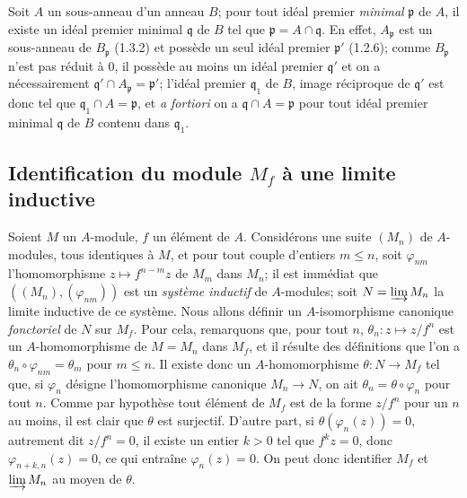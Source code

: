 \begin{env}[1.5.8]
\label{0.1.5.8-fr}
Soit $A$ un sous-anneau d'un anneau $B$; pour tout idéal premier
\emph{minimal} $\mathfrak p$ de $A$, il existe un idéal premier minimal
$\mathfrak q$ de $B$ tel que $\mathfrak p=A\cap\mathfrak q$. En effet,
$A_{\mathfrak p}$ est un sous-anneau de $B_{\mathfrak p}$ (1.3.2) et possède
un seul idéal premier $\mathfrak p'$ (1.2.6); comme $B_{\mathfrak p}$ n'est pas
réduit à $0$, il possède au moins un idéal premier $\mathfrak q'$ et on a
nécessairement $\mathfrak q'\cap A_{\mathfrak p}=\mathfrak p'$; l'idéal premier
$\mathfrak q_1$ de $B$, image réciproque de $\mathfrak q'$ est donc tel que
$\mathfrak q_1\cap A=\mathfrak p$, et \emph{a fortiori} on a
$\mathfrak q\cap A=\mathfrak p$ pour tout idéal premier minimal $\mathfrak q$
de $B$ contenu dans $\mathfrak q_1$.
\end{env}

\subsection{Identification du module $M_f$ à une limite inductive}
\label{subsection:0.1.6-fr}

\begin{env}[1.6.1]
\label{0.1.6.1-fr}
Soient $M$ un $A$-module, $f$ un élément de $A$. Considérons une suite
$(M_n)$ de $A$-modules, tous identiques à $M$, et pour tout couple d'entiers
$m\leq n$, soit $\varphi_{nm}$ l'homomorphisme $z\mapsto f^{n-m}z$ de $M_m$
dans $M_n$; il est immédiat que $((M_n),(\varphi_{nm}))$ est un \emph{système
inductif} de $A$-modules; soit $N=\varinjlim M_n$ la limite inductive de ce
système. Nous allons définir un $A$-isomorphisme canonique \emph{fonctoriel} de
$N$ sur $M_f$. Pour cela, remarquons que, pour tout $n$,
$\theta_n:z\mapsto z/f^n$ est un $A$-homomorphisme de $M=M_n$ dans $M_f$, et
il résulte des définitions que l'on a $\theta_n\circ\varphi_{nm}=\theta_m$ pour
$m\leq n$. Il existe donc un $A$-homomorphisme $\theta:N\to M_f$ tel que, si
$\varphi_n$ désigne l'homomorphisme canonique $M_n\to N$, on ait
$\theta_n=\theta\circ\varphi_n$ pour tout $n$. Comme par hypothèse tout élément
de $M_f$ est de la forme $z/f^n$ pour un $n$ au moins, il est clair que
$\theta$ est surjectif. D'autre part, si $\theta(\varphi_n(z))=0$, autrement dit
$z/f^n=0$, il existe un entier $k>0$ tel que $f^kz=0$, donc
$\varphi_{n+k,n}(z)=0$, ce qui entraîne $\varphi_n(z)=0$. On peut donc
identifier $M_f$ et $\varinjlim M_n$ au moyen de $\theta$.
\end{env}

